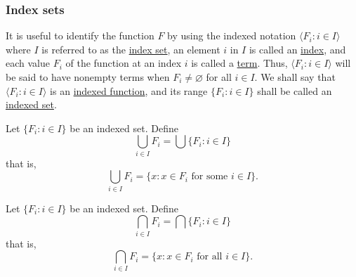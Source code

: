 \subsubsection{Index sets}

It is useful to identify the function $F$ by using the indexed notation $\langle F_i : i \in I \rangle$ where $I$ is referred to as the \underline{index set}, an element $i$ in $I$ is called an \underline{index}, and each value $F_i$ of the function at an index $i$ is called a \underline{term}. Thus, $\langle F_i : i \in I \rangle$ will be said to have nonempty terms when $F_i \neq \varnothing$ for all $i \in I$. We shall say that $\langle F_i : i \in I \rangle$ is an \underline{indexed function}, and its range $\{ F_i : i \in I \}$ shall be called an \underline{indexed set}.

\begin{definition}{}{}
    Let $\{ F_i : i \in I \}$ be an indexed set. Define
\[
    \bigcup_{i \in I} F_i = \bigcup \{F_{i} : i \in I\}
\]
that is,
\[
    \bigcup_{i \in I}F_{i} = \{ x : x \in F_i \text{ for some } i \in I \}.
\]
\end{definition}

\begin{definition}{}{}
    Let $\{ F_i : i \in I \}$ be an indexed set. Define
\[
    \bigcap_{i \in I} F_i = \bigcap \{F_{i} : i \in I\}
\]
that is,
\[
    \bigcap_{i \in I}F_{i} = \{ x : x \in F_i \text{ for all } i \in I \}.
\]
\end{definition}


